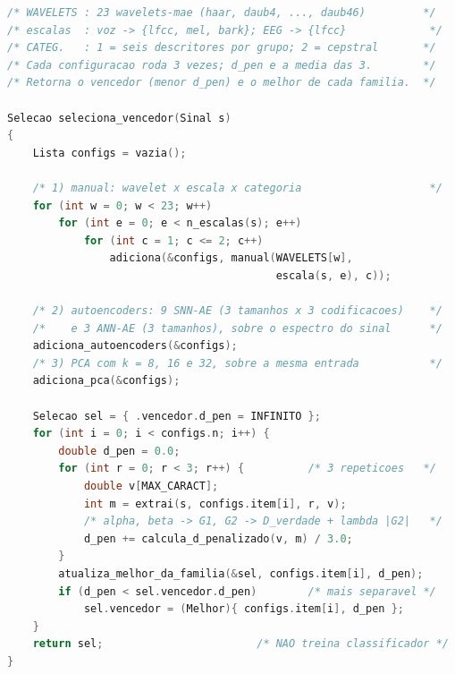 \begin{lstlisting}[language=C, caption={Fase 00 --- varredura de extratores e seleção do vencedor de um sinal pela engenharia paraconsistente. Executada uma vez para cada um dos três sinais (voz, EEG de fala pronunciada, EEG de fala imaginada).}, label={lst:e05Phase00}]
/* WAVELETS : 23 wavelets-mae (haar, daub4, ..., daub46)         */
/* escalas  : voz -> {lfcc, mel, bark}; EEG -> {lfcc}             */
/* CATEG.   : 1 = seis descritores por grupo; 2 = cepstral       */
/* Cada configuracao roda 3 vezes; d_pen e a media das 3.        */
/* Retorna o vencedor (menor d_pen) e o melhor de cada familia.  */

Selecao seleciona_vencedor(Sinal s)
{
    Lista configs = vazia();

    /* 1) manual: wavelet x escala x categoria                    */
    for (int w = 0; w < 23; w++)
        for (int e = 0; e < n_escalas(s); e++)
            for (int c = 1; c <= 2; c++)
                adiciona(&configs, manual(WAVELETS[w],
                                          escala(s, e), c));

    /* 2) autoencoders: 9 SNN-AE (3 tamanhos x 3 codificacoes)    */
    /*    e 3 ANN-AE (3 tamanhos), sobre o espectro do sinal      */
    adiciona_autoencoders(&configs);
    /* 3) PCA com k = 8, 16 e 32, sobre a mesma entrada           */
    adiciona_pca(&configs);

    Selecao sel = { .vencedor.d_pen = INFINITO };
    for (int i = 0; i < configs.n; i++) {
        double d_pen = 0.0;
        for (int r = 0; r < 3; r++) {          /* 3 repeticoes   */
            double v[MAX_CARACT];
            int m = extrai(s, configs.item[i], r, v);
            /* alpha, beta -> G1, G2 -> D_verdade + lambda |G2|   */
            d_pen += calcula_d_penalizado(v, m) / 3.0;
        }
        atualiza_melhor_da_familia(&sel, configs.item[i], d_pen);
        if (d_pen < sel.vencedor.d_pen)        /* mais separavel */
            sel.vencedor = (Melhor){ configs.item[i], d_pen };
    }
    return sel;                        /* NAO treina classificador */
}
\end{lstlisting}
